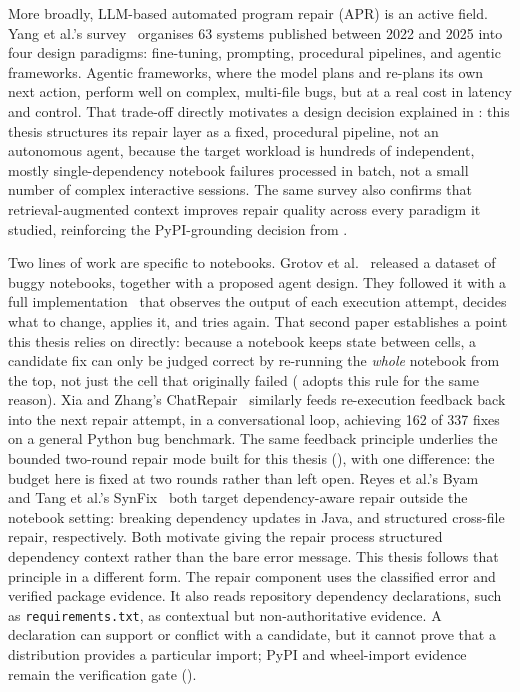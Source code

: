 More broadly, LLM-based automated program repair (APR) is an active
field. Yang et al.'s survey~\cite{yang2025aprsurvey} organises 63
systems published between 2022 and 2025 into four design paradigms:
fine-tuning, prompting, procedural pipelines, and agentic frameworks.
Agentic frameworks, where the model plans and re-plans its own next
action, perform well on complex, multi-file bugs, but at a real cost in
latency and control. That trade-off directly motivates a design
decision explained in : this thesis structures
its repair layer as a fixed, procedural pipeline, not an autonomous
agent, because the target workload is hundreds of independent, mostly
single-dependency notebook failures processed in batch, not a small
number of complex interactive sessions. The same survey also confirms
that retrieval-augmented context improves repair quality across every
paradigm it studied, reinforcing the PyPI-grounding decision from
.

Two lines of work are specific to notebooks. Grotov et
al.~\cite{grotov2024untangling} released a dataset of buggy notebooks,
together with a proposed agent design. They followed it
with a full implementation~\cite{grotov2024debug} that observes the
output of each execution attempt, decides what to change, applies it,
and tries again. That second paper establishes a point this thesis
relies on directly: because a notebook keeps state between cells, a
candidate fix can only be judged correct by re-running the
\emph{whole} notebook from the top, not just the cell that originally
failed ( adopts this rule for the same reason).
Xia and Zhang's ChatRepair~\cite{xia2024chatrepair} similarly feeds
re-execution feedback back into the next repair attempt, in a
conversational loop, achieving 162 of 337 fixes on a general Python bug
benchmark. The same feedback principle underlies the bounded two-round
repair mode built for this thesis (), with one
difference: the budget here is fixed at two rounds rather than left open.
Reyes et
al.'s Byam~\cite{reyes2025byam} and Tang et al.'s
SynFix~\cite{tang2025synfix} both target dependency-aware repair
outside the notebook setting: breaking dependency updates in Java, and
structured cross-file repair, respectively. Both motivate giving the
repair process structured dependency context rather than the bare error
message. This thesis follows that principle in a different form. The repair
component uses the classified error and verified package evidence. It also
reads repository dependency declarations, such as \texttt{requirements.txt},
as contextual but non-authoritative evidence. A declaration can support or
conflict with a candidate, but it cannot prove that a distribution provides a
particular import; PyPI and wheel-import evidence remain the verification gate
().

